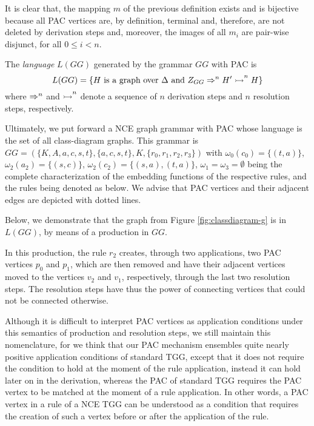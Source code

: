 It is clear that, the mapping $m$ of the previous definition exists and is bijective because all PAC vertices are, by definition, terminal and, therefore, are not deleted by derivation steps and, moreover, the images of all $m_i$ are pair-wise disjunct, for all $0 \le i < n$.

\begin{definition}
	The \emph{language} $L(GG)$ generated by the grammar $GG$ with PAC is
	\begin{equation*}
		L(GG) = \{ H \text{ is a graph over } \Delta \text{ and } Z_{GG} \Rightarrow^{n}_{} H' \overset{}{\rightarrowtail}^{n} H \}
	\end{equation*}
	where $\Rightarrow^{n}_{}$ and $\overset{}{\rightarrowtail}^{n}$ denote a sequence of $n$ derivation steps and $n$ resolution steps, respectively.
\end{definition}

Ultimately, we put forward a NCE graph grammar with PAC whose language is the set of all class-diagram graphs. This grammar is $GG = (\{K, A, a, c, s, t\}, \{a, c, s, t\}, K, \{r_0, r_1, r_2, r_3\})$ with $\omega_0(c_0) = \{(t,a)\}$, $\omega_2(a_2) = \{(s,c)\}$, $\omega_2(c_2) = \{(s,a),(t,a)\}$, $\omega_1 = \omega_3 = \emptyset$ being the complete characterization of the embedding functions of the respective rules, and the rules being denoted as below. We advise that PAC vertices and their adjacent edges are depicted with dotted lines.
%


Below, we demonstrate that the graph from Figure \ref{fig:classdiagram-g} is in $L(GG)$, by means of a production in $GG$.
%


In this production, the rule $r_2$ creates, through two applications, two PAC vertices $p_0$ and $p_1$, which are then removed and have their adjacent vertices moved to the vertices $v_2$ and $v_1$, respectively, through the last two resolution steps. The resolution steps have thus the power of connecting vertices that could not be connected otherwise.

Although it is difficult to interpret PAC vertices as application conditions under this semantics of production and resolution steps, we still maintain this nomenclature, for we think that our PAC mechanism ensembles quite nearly positive application conditions of standard TGG, except that it does not require the condition to hold at the moment of the rule application, instead it can hold later on in the derivation, whereas the PAC of standard TGG requires the PAC vertex to be matched at the moment of a rule application. In other words, a PAC vertex in a rule of a NCE TGG can be understood as a condition that requires the creation of such a vertex before or after the application of the rule.


